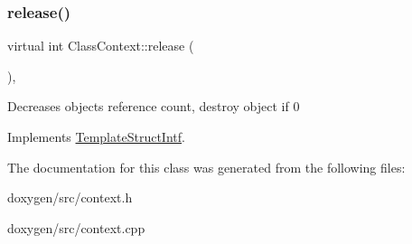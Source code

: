 \subsubsection{\texorpdfstring{release()}{release()}}
{\footnotesize\ttfamily virtual int Class\+Context\+::release (\begin{DoxyParamCaption}{ }\end{DoxyParamCaption})\hspace{0.3cm}{\ttfamily [inline]}, {\ttfamily [virtual]}}

Decreases object\textquotesingle{}s reference count, destroy object if 0 

Implements \mbox{\hyperlink{class_template_struct_intf_a3dce7dd29d3f66a8080b40578e8a5045}{Template\+Struct\+Intf}}.



The documentation for this class was generated from the following files\+:\begin{DoxyCompactItemize}
\item 
doxygen/src/context.\+h\item 
doxygen/src/context.\+cpp\end{DoxyCompactItemize}

